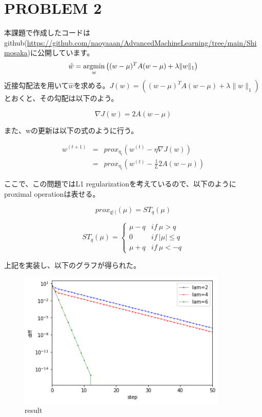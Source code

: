 \documentclass[a4j,11pt]{jarticle}
\newcommand{\argmin}{\mathop{\rm argmin}\limits}
\begin{document}
\newpage
\section{PROBLEM 2}
本課題で作成したコードはgithub(\url{https://github.com/naoyaaan/AdvancedMachineLearning/tree/main/Shimosaka})に公開しています。
\begin{equation}
    \hat{w} = \argmin_{w} \left((w-\mu)^{T}A(w-\mu)+\lambda \|w\|_1\right)
\end{equation}
近接勾配法を用いて$\hat{w}$を求める。$J(w) = \left((w-\mu)^{T}A(w-\mu)+\lambda \|w\|_1\right)$とおくと、その勾配は以下のよう。

\begin{equation}
    \nabla J(w) = 2A(w-\mu)
\end{equation}

また、wの更新は以下の式のように行う。

\begin{eqnarray}
    w^{(t+1)} &=& prox_{\eta_t} \left(w^{(t)} - \eta\nabla J(w)\right)\\
    &=& prox_{\eta_t} \left(w^{(t)} - \frac{1}{L}2A(w-\mu)\right)
\end{eqnarray}

ここで、この問題ではL1 regularizationを考えているので、以下のようにproximal operationは表せる。

\begin{equation}
    prox_{q|\cdot|}(\mu) = ST_q(\mu)
\end{equation}

\begin{equation}
    ST_q(\mu) = \begin{cases}
        \mu-q & if~\mu > q \\
        0 & if~|\mu| \leq q \\
        \mu+q & if~\mu < -q
    \end{cases}
\end{equation}

上記を実装し、以下のグラフが得られた。
\begin{figure}[htbp]
    \centering
    \includegraphics[width=100mm]{p2-4.png}
    \caption{result}
\end{figure}
\end{document}
